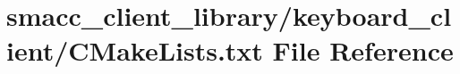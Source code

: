 \hypertarget{client__library_2keyboard__client_2CMakeLists_8txt}{}\section{smacc\+\_\+client\+\_\+library/keyboard\+\_\+client/\+C\+Make\+Lists.txt File Reference}
\label{client__library_2keyboard__client_2CMakeLists_8txt}

